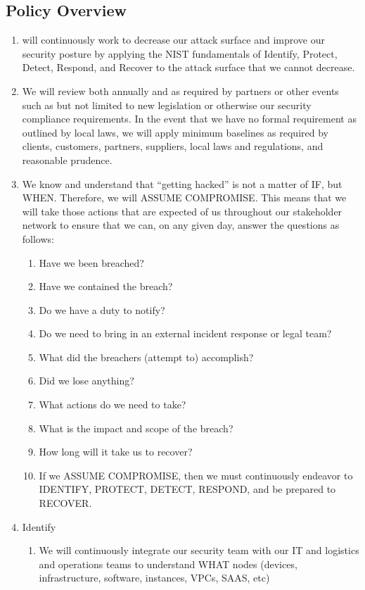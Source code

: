 \documentclass[../main.tex]{subfiles}
\begin{document}
\subsection{Policy Overview}
\begin{enumerate}
    \item \CompanyName{} will continuously work to decrease our attack surface and improve our security posture by applying the NIST fundamentals of
    Identify, Protect, Detect, Respond, and Recover to the attack surface that we cannot decrease.
    \item We will review both annually and as required by partners or other events such as but not limited to new legislation or otherwise our security compliance requirements.
    In the event that we have no formal requirement as outlined by local laws, we will apply minimum baselines as required by clients, customers, partners, suppliers, local laws and regulations,
    and reasonable prudence.
    \item We know and understand that “getting hacked” is not a matter of IF, but WHEN. Therefore, we will ASSUME COMPROMISE. This means that we will take those actions that are expected of us
    throughout our stakeholder network to ensure that we can, on any given day, answer the questions as follows:
    \begin{enumerate}
        \item Have we been breached?
        \item Have we contained the breach?
        \item Do we have a duty to notify?
        \item Do we need to bring in an external incident response or legal team?
        \item What did the breachers (attempt to) accomplish?
        \item Did we lose anything?
        \item What actions do we need to take?
        \item What is the impact and scope of the breach?
        \item How long will it take us to recover?
        \item If we ASSUME COMPROMISE, then we must continuously endeavor to IDENTIFY, PROTECT, DETECT, RESPOND, and be prepared to RECOVER.
    \end{enumerate}
    \item Identify
    \begin{enumerate}
        \item We will continuously integrate our security team with our IT and logistics and operations teams to understand WHAT nodes (devices, infrastructure, software, instances, VPCs, SAAS, etc)

\end{enumerate}
\end{enumerate}
\end{document}
